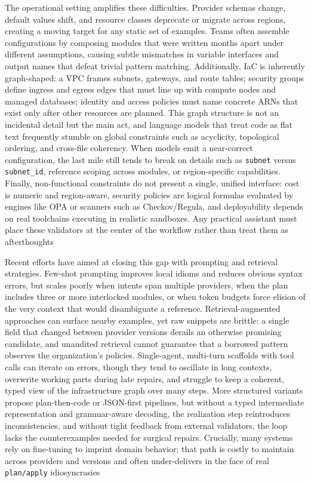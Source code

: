 \documentclass[manuscript,screen,nonacm]{acmart}
\begin{document}
The operational setting amplifies these difficulties. Provider schemas change, default values shift, and resource classes deprecate or migrate across regions, creating a moving target for any static set of examples. Teams often assemble configurations by composing modules that were written months apart under different assumptions, causing subtle mismatches in variable interfaces and output names that defeat trivial pattern matching. Additionally, IaC is inherently graph-shaped: a VPC frames subnets, gateways, and route tables; security groups define ingress and egress edges that must line up with compute nodes and managed databases; identity and access policies must name concrete ARNs that exist only after other resources are planned. This graph structure is not an incidental detail but the main act, and language models that treat code as flat text frequently stumble on global constraints such as acyclicity, topological ordering, and cross-file coherency. When models emit a near-correct configuration, the last mile still tends to break on details such as \texttt{subnet} versus \texttt{subnet\_id}, reference scoping across modules, or region-specific capabilities. Finally, non-functional constraints do not present a single, unified interface: cost is numeric and region-aware, security policies are logical formulas evaluated by engines like OPA or scanners such as Checkov/Regula, and deployability depends on real toolchains executing in realistic sandboxes. Any practical assistant must place these validators at the center of the workflow rather than treat them as afterthoughts

Recent efforts have aimed at closing this gap with prompting and retrieval strategies. Few-shot prompting improves local idioms and reduces obvious syntax errors, but scales poorly when intents span multiple providers, when the plan includes three or more interlocked modules, or when token budgets force elision of the very context that would disambiguate a reference. Retrieval-augmented approaches can surface nearby examples, yet raw snippets are brittle: a single field that changed between provider versions derails an otherwise promising candidate, and unaudited retrieval cannot guarantee that a borrowed pattern observes the organization’s policies. Single-agent, multi-turn scaffolds with tool calls can iterate on errors, though they tend to oscillate in long contexts, overwrite working parts during late repairs, and struggle to keep a coherent, typed view of the infrastructure graph over many steps. More structured variants propose plan-then-code or JSON-first pipelines, but without a typed intermediate representation and grammar-aware decoding, the realization step reintroduces inconsistencies, and without tight feedback from external validators, the loop lacks the counterexamples needed for surgical repairs. Crucially, many systems rely on fine-tuning to imprint domain behavior; that path is costly to maintain across providers and versions and often under-delivers in the face of real \texttt{plan/apply} idiosyncrasies
\end{document}
